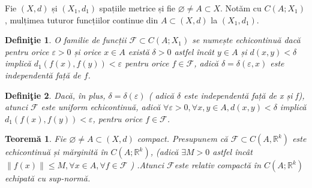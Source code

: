 \documentclass[a4paper,12pt,oneside]{report}
\newtheorem{definition}{Defini\c tie}
\newtheorem{theorem}{Teorem\u a}
\begin{document}
Fie \(\left ( X,d \right )\) și \(\left ( X_{1},d_{1} \right )\) spațiile metrice și fie \(\varnothing \neq A\subset X\). Notăm cu \(C\left ( A;X_{1} \right )\), mulțimea tuturor funcțiilor continue din \(A\subset \left ( X,d \right )\) la \(\left ( X_{1},d_{1} \right )\).
\begin{definition}
O familie de funcții \(\mathcal{F} \subset C\left ( A;X_{1} \right )\) se numește echicontinuă dacă pentru orice \(\varepsilon > 0\) și orice \(x \in A\) există \(\delta > 0\) astfel încât \(y \in A\) și \(d\left ( x,y \right )< \delta \) implică \(d_{1}\left ( f\left ( x \right ),f\left ( y \right ) \right )< \varepsilon \) pentru orice \(f \in \mathcal{F} \), adică \(\delta =\delta \left ( \varepsilon ,x \right )\) este independentă față de \(f\). 
\end{definition}
\begin{definition}
Dacă, în plus, \(\delta =\delta \left ( \varepsilon  \right )\) ( adică \(\delta\) este independentă față de x și f), atunci \(\mathcal{F}\) este uniform echicontinuă, adică \(\forall \varepsilon > 0, \forall x,y \in A, d\left ( x,y \right )< \delta \) implică \(d_{1}\left ( f\left ( x \right ), f\left ( y \right ) \right )< \varepsilon \), pentru orice \(f\in \mathcal{F}\). 
\end{definition}
\begin{theorem}
Fie \(\varnothing \neq A\subset \left ( X,d \right )\) compact. Presupunem că \(\mathcal{F} \subset C\left ( A,\mathbb{R}^{k} \right )\) este echicontinuă și mărginită în \(C\left ( A;\mathbb{R}^{k} \right )\), (adică \(\exists M> 0\) astfel încât \(\left \| f\left ( x \right ) \right \| \leq M, \forall x \in A, \forall f \in \mathcal{F}\) ) .Atunci \(\mathcal{F}\)este relativ compactă în \(C\left ( A;\mathbb{R}^{k} \right )\) echipată cu sup-normă. 
\end{theorem}
\end{document}

